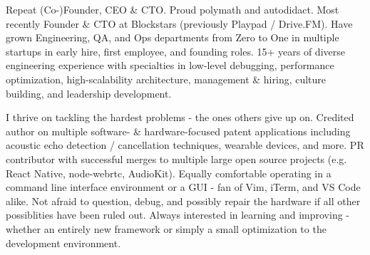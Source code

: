 

\begin{cvparagraph}

Repeat (Co-)Founder, CEO \& CTO. Proud polymath and autodidact. Most recently Founder \& CTO at Blockstars (previously Playpad / Drive.FM). Have grown Engineering, QA, and Ops departments from Zero to One in multiple startups in early hire, first employee, and founding roles. 15+ years of diverse engineering experience with specialties in low-level debugging, performance optimization, high-scalability architecture, management \& hiring, culture building, and leadership development.

I thrive on tackling the hardest problems - the ones others give up on. Credited author on multiple software- \& hardware-focused patent applications including acoustic echo detection / cancellation techniques, wearable devices, and more. PR contributor with successful merges to multiple large open source projects (e.g. React Native, node-webrtc, AudioKit). Equally comfortable operating in a command line interface environment or a GUI - fan of Vim, iTerm, and VS Code alike.  Not afraid to question, debug, and possibly repair the hardware if all other possiblities have been ruled out. Always interested in learning and improving - whether an entirely new framework or simply a small optimization to the development environment.
\end{cvparagraph}
